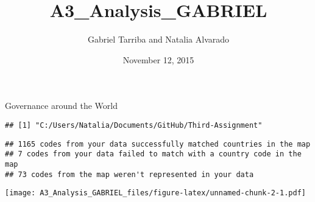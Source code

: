 \documentclass[]{article}
\title{A3\_Analysis\_GABRIEL}
\author{Gabriel Tarriba and Natalia Alvarado}
\date{November 12, 2015}
\begin{document}
\maketitle


Governance around the World

\begin{verbatim}
## [1] "C:/Users/Natalia/Documents/GitHub/Third-Assignment"
\end{verbatim}

\begin{verbatim}
## 1165 codes from your data successfully matched countries in the map
## 7 codes from your data failed to match with a country code in the map
## 73 codes from the map weren't represented in your data
\end{verbatim}

\texttt{[image: A3\_Analysis\_GABRIEL\_files/figure-latex/unnamed-chunk-2-1.pdf]}
\end{document}
